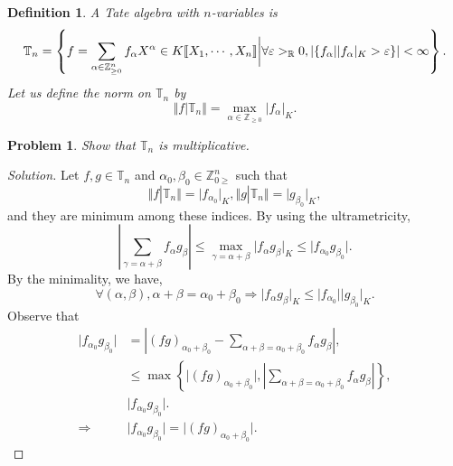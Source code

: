 \documentclass[8pt]{article}
\numberwithin{equation}{section}
\newenvironment{solution}{\begin{proof}[Solution]}{\end{proof}}
\newtheorem{definition}{Definition}[section]
\newtheorem{problem}{Problem}[section]
\newcommand{\norm}[1]{\Vert #1 \Vert}
\newcommand{\R}[0]{\mathbb{R}}
\newcommand{\Z}[0]{\mathbb{Z}}
\newcommand{\T}[0]{\mathbb{T}}
\newcommand{\ab}[1]{\vert #1 \vert}
\begin{document}
\begin{definition}
  A Tate algebra with $n$-variables is 
  \begin{equation*}
    \T_n = \left\{ f=\sum_{\alpha\in\Z_{\geq0}^n}f_\alpha X^\alpha\in K\llbracket X_1,\cdots,X_n\rrbracket\bigg{|}\forall \varepsilon>_\R0, \vert \{f_\alpha|\ab{f_\alpha}_K>\varepsilon\}\vert<\infty\right\}.
  \end{equation*}
  Let us define the norm on $\T_n$ by 
  \begin{equation*}
    \norm{f|\T_n} = \max_{\alpha\in\Z_{\geq0}}\ab{f_\alpha}_K.
  \end{equation*}
\end{definition}
\begin{problem}
  Show that $\T_n$ is multiplicative.
\end{problem}
\begin{solution}
Let $f,g\in\T_n$ and $\alpha_0,\beta_0\in\Z_{0\geq}^n$ such that 
\begin{equation*}
  \norm{f|\T_n} = \ab{f_{\alpha_0}}_K,\norm{g|\T_n} = \ab{g_{\beta_0}}_K,
\end{equation*}
and they are minimum among these indices. By using the ultrametricity, 
\begin{equation*}
  \left\vert \sum_{\gamma = \alpha+\beta}f_\alpha g_\beta\right\vert \leq \max_{\gamma=\alpha+\beta}\ab{f_\alpha g_\beta}_K\leq \ab{f_{\alpha_0}g_{\beta_0}}.
\end{equation*}
By the minimality, we have,
\begin{equation*}
  \forall (\alpha,\beta), \alpha+\beta=\alpha_0+\beta_0\Rightarrow \ab{f_{\alpha}g_{\beta}}_K\leq \ab{f_{\alpha_0}}\ab{g_{\beta_0}}_K.
\end{equation*}
Observe that 
\begin{align*}
  \ab{f_{\alpha_0}g_{\beta_0}} &= \left\vert (fg)_{\alpha_0+\beta_0}-\sum_{\alpha+\beta=\alpha_0+\beta_0}f_\alpha g_\beta\right\vert,\\
  &\leq \max\left\{\vert (fg)_{\alpha_0+\beta_0}\vert,\left\vert\sum_{\alpha+\beta=\alpha_0+\beta_0}f_\alpha g_\beta\right\vert\right\},\\
  & \ab{f_{\alpha_0}g_{\beta_0}}.\\
  \Rightarrow &\ab{f_{\alpha_0}g_{\beta_0}} = \vert (fg)_{\alpha_0+\beta_0}\vert.
\end{align*}
\end{solution}
\end{document}
